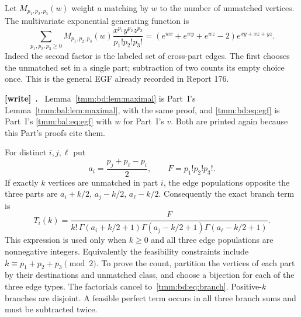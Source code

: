 \documentclass[11pt,letterpaper]{article}
\theoremstyle{remark}\newtheorem{remark}[theorem]{Remark}
\newenvironment{writenote}[1][]{\par\smallskip\begingroup\small
 \noindent\textbf{[write]}\if\relax\detokenize{#1}\relax\else~\textbf{#1.}\fi\ }%
 {\par\endgroup\smallskip}
\begin{document}
Let $M_{p_1,p_2,p_3}(w)$ weight a matching by $w$ to the number of unmatched vertices. The multivariate exponential generating function is
\begin{equation}\label{tmm:bd:eq:egf}
 \sum_{p_1,p_2,p_3\ge0}M_{p_1,p_2,p_3}(w)
 \frac{x^{p_1}y^{p_2}z^{p_3}}{p_1!p_2!p_3!}
 =(e^{wx}+e^{wy}+e^{wz}-2)e^{xy+xz+yz}.
\end{equation}
Indeed the second factor is the labeled set of cross-part edges. The first chooses the unmatched set in a single part; subtraction of two counts its empty choice once. This is the general EGF already recorded in Report 176.
\begin{writenote}
Lemma~\ref{tmm:bd:lem:maximal} is Part~I's Lemma~\ref{tmm:bal:lem:maximal}, with the same proof, and \eqref{tmm:bd:eq:egf} is Part~I's \eqref{tmm:bal:eq:egf} with $w$ for Part~I's $v$. Both are printed again because this Part's proofs cite them.
\end{writenote}

For distinct $i,j,\ell$ put
\[
 a_i=\frac{p_j+p_\ell-p_i}{2},\qquad F=p_1!p_2!p_3!.
\]
If exactly $k$ vertices are unmatched in part $i$, the edge populations opposite the three parts are $a_i+k/2$, $a_j-k/2$, $a_\ell-k/2$. Consequently the exact branch term is
\begin{equation}\label{tmm:bd:eq:branch}
 T_i(k)=\frac{F}{k!\,\Gamma(a_i+k/2+1)
                    \Gamma(a_j-k/2+1)\Gamma(a_\ell-k/2+1)}.
\end{equation}
This expression is used only when $k\ge0$ and all three edge populations are nonnegative integers. Equivalently the feasibility constraints include $k\equiv p_1+p_2+p_3\pmod2$. To prove the count, partition the vertices of each part by their destinations and unmatched class, and choose a bijection for each of the three edge types. The factorials cancel to~\eqref{tmm:bd:eq:branch}. Positive-$k$ branches are disjoint. A feasible perfect term occurs in all three branch sums and must be subtracted twice.
\end{document}

